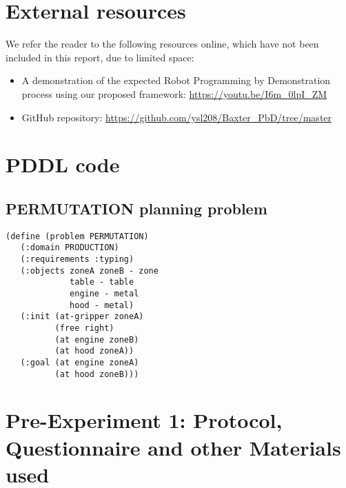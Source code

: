 \chapter{External resources}\label{External resources}
We refer the reader to the following resources online, which have not been included in this report, due to limited space:
\begin{itemize}
\item A demonstration of the expected Robot Programming by Demonstration process using our proposed framework: \url{https://youtu.be/I6m_0lpI_ZM}
\item GitHub repository: \url{https://github.com/ysl208/Baxter_PbD/tree/master}
\end{itemize}

\chapter{PDDL code}
                     
\section{PERMUTATION planning problem}
\begin{verbatim}
(define (problem PERMUTATION)
   (:domain PRODUCTION)
   (:requirements :typing)
   (:objects zoneA zoneB - zone
             table - table
             engine - metal
             hood - metal)
   (:init (at-gripper zoneA)
          (free right)
          (at engine zoneB)
          (at hood zoneA))
   (:goal (at engine zoneA)
          (at hood zoneB)))
\end{verbatim}


\chapter{Pre-Experiment 1: Protocol, Questionnaire and other Materials used}
\label{app:exp1}
%
%
%

